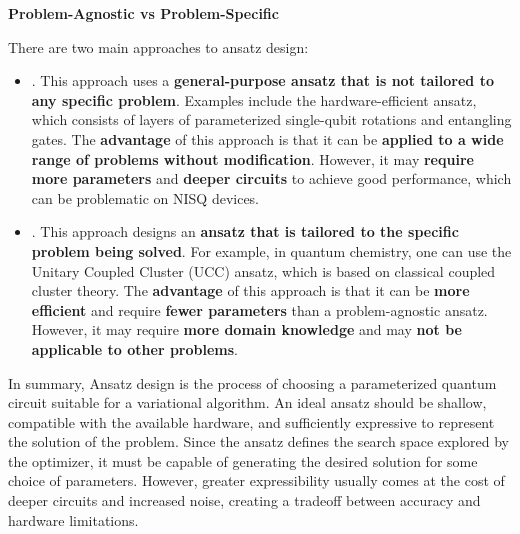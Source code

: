 \highspace
\begin{flushleft}
    \textcolor{DarkOrange3}{ \textbf{Problem-Agnostic vs Problem-Specific}}
\end{flushleft}
There are two main approaches to ansatz design:
\begin{itemize}
    \item {}. This approach uses a \textbf{general-purpose ansatz that is not tailored to any specific problem}. Examples include the hardware-efficient ansatz, which consists of layers of parameterized single-qubit rotations and entangling gates. The \textbf{advantage} of this approach is that it can be \textbf{applied to a wide range of problems without modification}. However, it may \textbf{require more parameters} and \textbf{deeper circuits} to achieve good performance, which can be problematic on NISQ devices.
    \item {}. This approach designs an \textbf{ansatz that is tailored to the specific problem being solved}. For example, in quantum chemistry, one can use the Unitary Coupled Cluster (UCC) ansatz, which is based on classical coupled cluster theory. The \textbf{advantage} of this approach is that it can be \textbf{more efficient} and require \textbf{fewer parameters} than a problem-agnostic ansatz. However, it may require \textbf{more domain knowledge} and may \textbf{not be applicable to other problems}.
\end{itemize}

\highspace
In summary, Ansatz design is the process of choosing a parameterized quantum circuit suitable for a variational algorithm. An ideal ansatz should be shallow, compatible with the available hardware, and sufficiently expressive to represent the solution of the problem. Since the ansatz defines the search space explored by the optimizer, it must be capable of generating the desired solution for some choice of parameters. However, greater expressibility usually comes at the cost of deeper circuits and increased noise, creating a tradeoff between accuracy and hardware limitations.